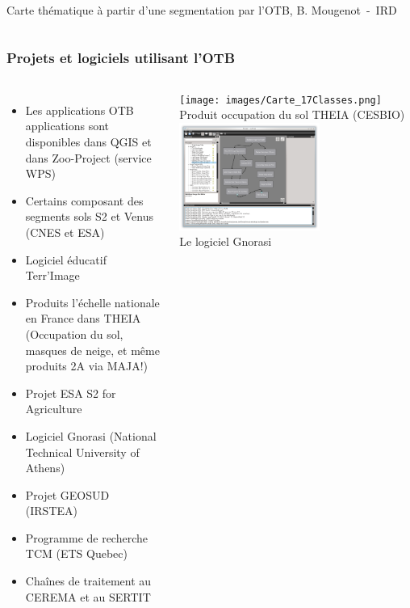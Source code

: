 \documentclass[8pt]{beamer}
\begin{document}
\begin{frame}
\begin{columns}
\tiny{Carte thématique à partir d'une segmentation par l'OTB, B. Mougenot~-~IRD}
\end{columns}
\end{frame}

\begin{frame}
  \frametitle{Projets et logiciels utilisant l'OTB}
  \vspace{-0.5cm}
\begin{columns}
  \begin{itemize}
    \item Les applications OTB applications sont disponibles dans QGIS et dans Zoo-Project (service WPS)
    \item Certains composant des segments sols S2 et
      Venus (CNES et ESA)
    \item Logiciel éducatif Terr'Image
    \item Produits l'échelle nationale en France
      dans THEIA (Occupation du sol, masques de neige, et même produits 2A via MAJA!)
    \item Projet ESA S2 for Agriculture
    \item Logiciel Gnorasi (National Technical University of Athens)
    \item Projet GEOSUD (IRSTEA)
    \item Programme de recherche TCM (ETS Quebec)
    \item Chaînes de traitement au CEREMA et au SERTIT
  \end{itemize}
\begin{center}
  \texttt{[image: images/Carte\_17Classes.png]}\\
  \tiny{Produit occupation du sol THEIA (CESBIO)}
  \includegraphics[width=0.6\textwidth]{images/gnorasi2.png}\\
  \tiny{Le logiciel Gnorasi}
\end{center}
\end{columns}
\end{frame}
\end{document}
